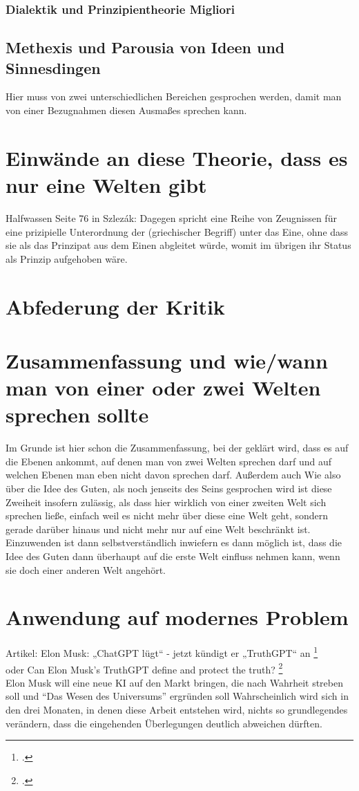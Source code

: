 \documentclass[12pt]{article}
\begin{document}
\subsubsection*{Dialektik und Prinzipientheorie Migliori}

\subsection{Methexis und Parousia von Ideen und Sinnesdingen}
Hier muss von zwei unterschiedlichen Bereichen gesprochen werden, damit man von einer Bezugnahmen diesen Ausmaßes sprechen kann. 
\section{Einwände an diese Theorie, dass es nur eine Welten gibt}
Halfwassen Seite 76 in Szlezák: Dagegen spricht eine Reihe von Zeugnissen für eine prizipielle Unterordnung der (griechischer Begriff) unter das Eine, ohne dass sie als das Prinzipat aus dem Einen abgleitet würde, womit im übrigen ihr Status als Prinzip aufgehoben wäre.
\section{Abfederung der Kritik}
\section{Zusammenfassung und wie/wann man von einer oder zwei Welten sprechen sollte}
Im Grunde ist hier schon die Zusammenfassung, bei der geklärt wird, dass es auf die Ebenen ankommt, auf denen man von zwei Welten sprechen darf und auf welchen Ebenen man eben nicht davon sprechen darf. Außerdem auch 
Wie also über die Idee des Guten, als noch jenseits des Seins gesprochen wird ist diese Zweiheit insofern zulässig, als dass hier wirklich von einer zweiten Welt sich sprechen ließe, einfach weil es nicht mehr über diese eine Welt geht, sondern gerade darüber hinaus und nicht mehr nur auf eine Welt beschränkt ist. Einzuwenden ist dann selbstverständlich inwiefern es dann möglich ist, dass die Idee des Guten dann überhaupt auf die erste Welt einfluss nehmen kann, wenn sie doch einer anderen Welt angehört.  
\section{Anwendung auf modernes Problem}
Artikel: Elon Musk: „ChatGPT lügt“ - jetzt kündigt er „TruthGPT“ an \footcite[][]{MuskTruthGPTFokus}\\
oder Can Elon Musk’s TruthGPT define and protect the truth? \footcite[][]{MuskTruthGPTReuters}\\
Elon Musk will eine neue KI auf den Markt bringen, die nach Wahrheit streben soll und \enquote{Das Wesen des Universums} ergründen soll
Wahrscheinlich wird sich in den drei Monaten, in denen diese Arbeit entstehen wird, nichts so grundlegendes verändern, dass die eingehenden Überlegungen deutlich abweichen dürften. 
\end{document}

